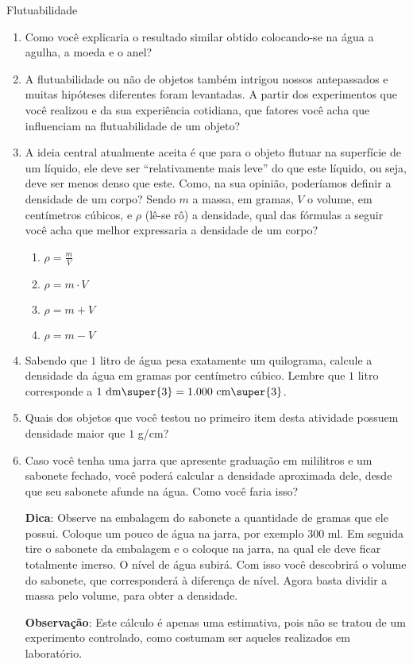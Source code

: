 \begin{task}{Flutuabilidade}
\begin{enumerate}
\item {} 
Como você explicaria o resultado similar obtido colocando-se na água a agulha, a moeda e o anel?

\item {} 
A flutuabilidade ou não de objetos também intrigou nossos antepassados e muitas hipóteses diferentes foram levantadas. A partir dos experimentos que você realizou e da sua experiência cotidiana,  que fatores você acha que influenciam na flutuabilidade de um objeto?

\item {} 
A ideia central atualmente aceita é que para o objeto flutuar na superfície de um líquido, ele deve ser “relativamente mais leve” do que este líquido, ou seja, deve ser menos denso que este. Como, na sua opinião, poderíamos definir a densidade de um corpo? Sendo $m$ a massa, em gramas, $V$ o volume, em centímetros cúbicos, e  $\rho$  (lê-se rô) a densidade, qual das fórmulas a seguir você acha que melhor expressaria a densidade de um corpo?

\begin{enumerate}[topsep=0pt]
\item $\rho = \displaystyle\frac{m}{V}$

\item $\rho = m \cdot V$

\item $\rho = m + V$

\item $\rho = m - V$
\end{enumerate}

\item {} 
Sabendo que $1$ litro de água pesa exatamente um quilograma, calcule a densidade da água em gramas por centímetro cúbico.  Lembre que $1$ litro corresponde a $1\text{ dm\super{3}}=1.000\text{ cm\super{3}}$.

\item {} 
Quais dos objetos que você testou no primeiro item desta atividade possuem densidade maior que $1$ g/cm?

\item {} 
Caso você tenha uma jarra que apresente graduação em mililitros e um sabonete fechado, você poderá calcular a densidade aproximada dele, desde que seu sabonete afunde na água.  Como você faria isso?

\textbf{Dica}: Observe na embalagem do sabonete a quantidade de gramas que ele possui. Coloque um pouco de água na jarra, por exemplo $300$ ml. Em seguida tire o sabonete da embalagem e o coloque na jarra, na qual ele deve ficar totalmente imerso. O nível de água subirá. Com isso você descobrirá o volume do sabonete, que corresponderá à diferença de nível. Agora basta dividir a massa pelo volume, para obter a densidade.

\textbf{Observação}: Este cálculo é apenas uma estimativa, pois não se tratou de um experimento controlado, como costumam ser aqueles realizados em laboratório.

\end{enumerate}
\end{task}




